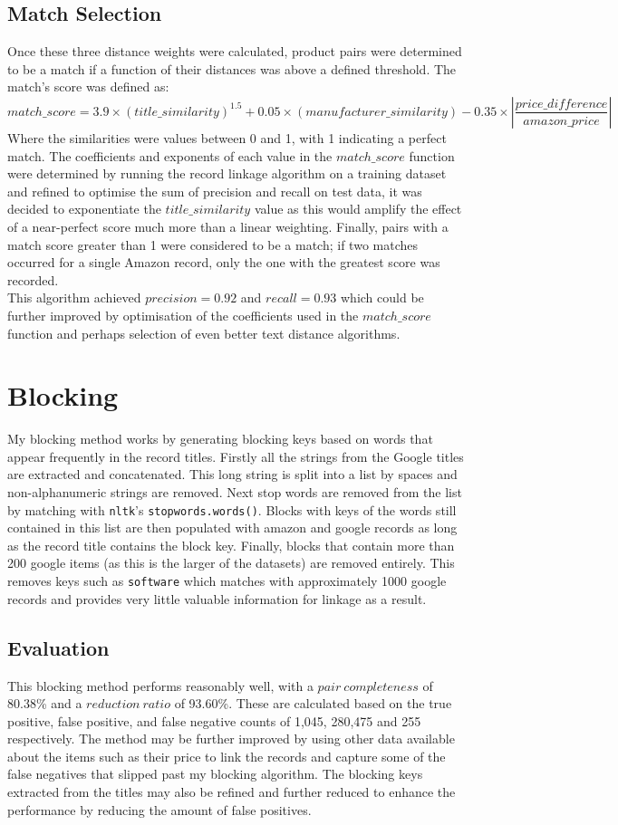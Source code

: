\documentclass{article}
\begin{document}
\subsection*{Match Selection}
Once these three distance weights were calculated, product pairs were determined to be a match if a function of their distances was above a defined threshold. The match's score was defined as:
$$ match\_score = 3.9 \times (title\_similarity)^{1.5} + 0.05 \times (manufacturer\_similarity) - 0.35 \times |\frac{price\_difference}{amazon\_price}|$$
Where the similarities were values between 0 and 1, with 1 indicating a perfect match. The coefficients and exponents of each value in the $match\_score$ function were determined by running the record linkage algorithm on a training dataset and refined to optimise the sum of precision and recall on test data, it was decided to exponentiate the $title\_similarity$ value as this would amplify the effect of a near-perfect score much more than a linear weighting. Finally, pairs with a match score greater than 1 were considered to be a match; if two matches occurred for a single Amazon record, only the one with the greatest score was recorded.\\[2mm]
This algorithm achieved $precision=0.92$ and $recall=0.93$ which could be further improved by optimisation of the coefficients used in the $match\_score$ function and perhaps selection of even better text distance algorithms.

\section*{Blocking}
My blocking method works by generating blocking keys based on words that appear frequently in the record titles. Firstly all the strings from the Google titles are extracted and concatenated. This long string is split into a list by spaces and non-alphanumeric strings are removed. Next stop words are removed from the list by matching with \verb|nltk|'s \verb|stopwords.words()|. Blocks with keys of the words still contained in this list are then populated with amazon and google records as long as the record title contains the block key. Finally, blocks that contain more than 200 google items (as this is the larger of the datasets) are removed entirely. This removes keys such as \verb|software| which matches with approximately 1000 google records and provides very little valuable information for linkage as a result.
\subsection*{Evaluation}
This blocking method performs reasonably well, with a $pair\ completeness$ of 80.38\% and a $reduction\ ratio$ of 93.60\%. These are calculated based on the true positive, false positive, and false negative counts of 1,045, 280,475 and 255 respectively. The method may be further improved by using other data available about the items such as their price to link the records and capture some of the false negatives that slipped past my blocking algorithm. The blocking keys extracted from the titles may also be refined and further reduced to enhance the performance by reducing the amount of false positives.
\end{document}

